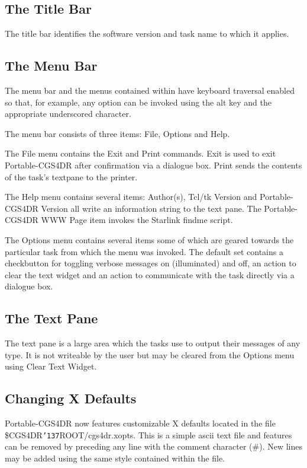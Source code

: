 \documentclass[a4paper]{book}
\renewcommand{\_}{{\tt\char'137}}
\begin{document}
\subsection{The Title Bar}
The title bar identifies the software version and task name to which it applies.

\subsection{The Menu Bar}
The menu bar and the menus contained within have keyboard traversal enabled so that, for example, any option
can be invoked using the {\sc alt} key and the appropriate underscored character.

The menu bar consists of three items: {\sf File}, {\sf Options} and {\sf Help}.

The {\sf File} menu contains the {\sf Exit} and {\sf Print} commands. {\sf Exit} is used to exit Portable-CGS4DR after confirmation
via a dialogue box. {\sf Print} sends the contents of the task's textpane to the printer.

The {\sf Help} menu contains several items: {\sf Author(s)}, {\sf Tcl/tk Version} and {\sf Portable-CGS4DR Version}
all write an information string to the text pane. The {\sf Portable-CGS4DR WWW Page} item invokes the Starlink findme script.

The {\sf Options} menu contains several items some of which are geared towards the particular task from
which the menu was invoked. The default set contains a checkbutton for toggling verbose messages on (illuminated)
and off, an action to clear the text widget and an action to communicate with the task directly via a dialogue box.

\subsection{The Text Pane}
The text pane is a large area which the tasks use to output their
messages of any type. It is not writeable by the user but may be
cleared from the {\sf Options} menu using {\sf Clear Text Widget}.

\subsection{Changing X Defaults}
Portable-CGS4DR now features customizable X defaults located in the file \$CGS4DR\_ROOT/cgs4dr.xopts.
This is a simple {\sc ascii} text file and features can be removed by preceding any line with the
comment character (\#). New lines may be added using the same style contained within the file.
\end{document}
